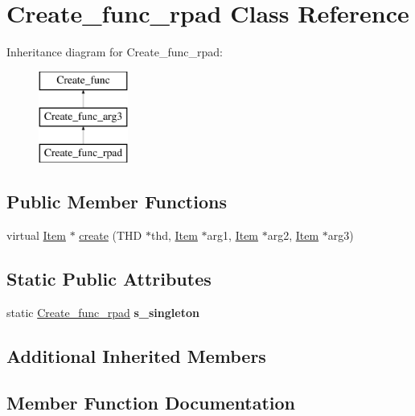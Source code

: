 \hypertarget{classCreate__func__rpad}{}\section{Create\+\_\+func\+\_\+rpad Class Reference}
\label{classCreate__func__rpad}
Inheritance diagram for Create\+\_\+func\+\_\+rpad\+:\begin{figure}[H]
\begin{center}
\leavevmode
\includegraphics[height=3.000000cm]{classCreate__func__rpad}
\end{center}
\end{figure}
\subsection*{Public Member Functions}
\begin{DoxyCompactItemize}
\item 
virtual \mbox{\hyperlink{classItem}{Item}} $\ast$ \mbox{\hyperlink{classCreate__func__rpad_a35666b02c86ba0178583e69c4a520976}{create}} (T\+HD $\ast$thd, \mbox{\hyperlink{classItem}{Item}} $\ast$arg1, \mbox{\hyperlink{classItem}{Item}} $\ast$arg2, \mbox{\hyperlink{classItem}{Item}} $\ast$arg3)
\end{DoxyCompactItemize}
\subsection*{Static Public Attributes}
\begin{DoxyCompactItemize}
\item 
\mbox{\label{classCreate__func__rpad_a886713b70bbd11a18df1cc910eab2565}} 
static \mbox{\hyperlink{classCreate__func__rpad}{Create\+\_\+func\+\_\+rpad}} {\bfseries s\+\_\+singleton}
\end{DoxyCompactItemize}
\subsection*{Additional Inherited Members}


\subsection{Member Function Documentation}
\mbox{\label{classCreate__func__rpad_a35666b02c86ba0178583e69c4a520976}} 
